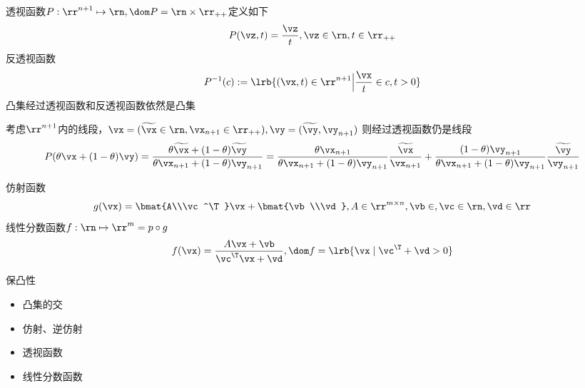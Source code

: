 \begin{definition}
透视函数$P:\rr^{n+1}\mapsto\rn,\dom P=\rn\times\rr_{++}$定义如下
\[P(\vz,t)=\dfrac{\vz}{t},\vz\in\rn,t\in\rr_{++}\]
反透视函数
\[P^{-1}(c):=\lrb{(\vx,t)\in\rr^{n+1}\Big|\frac{\vx}{t}\in c,t>0}\]
凸集经过透视函数和反透视函数依然是凸集
\end{definition}
\begin{analysis}
考虑$\rr^{n+1}$内的线段，$\vx=(\widetilde{\vx}\in\rn,\vx_{n+1}\in\rr_{++}),\vy=(\widetilde{\vy},\vy_{n+1})$
则经过透视函数仍是线段
\[P(\theta \vx+(1-\theta)\vy)=\frac{\theta\widetilde{\vx}+(1-\theta)\widetilde{\vy}}{\theta \vx_{n+1}+(1-\theta) \vy_{n+1}}=\frac{\theta \vx_{n+1}}{\theta \vx_{n+1}+(1-\theta)\vy_{n+1}}\frac{\widetilde{\vx}}{\vx_{n+1}}+\frac{(1-\theta)\vy_{n+1}}{\theta \vx_{n+1}+(1-\theta)\vy_{n+1}}\frac{\widetilde{\vy}}{\vy_{n+1}}\]
\end{analysis}

\begin{definition}[线性分数函数]
仿射函数
\[g(\vx)=\bmat{A\\\vc^\T}\vx+\bmat{\vb\\\vd},A\in\rr^{m\times n},\vb\in\rm,\vc\in\rn,\vd\in\rr\]
线性分数函数$f:\rn\mapsto\rr^m=p\circ g$
\[f(\vx)=\frac{A\vx+\vb}{\vc^\T \vx+\vd},\dom f=\lrb{\vx\mid \vc^\T+\vd>0}\]
\end{definition}

保凸性
\begin{itemize}
	\item 凸集的交
	\item 仿射、逆仿射
	\item 透视函数
	\item 线性分数函数
\end{itemize}